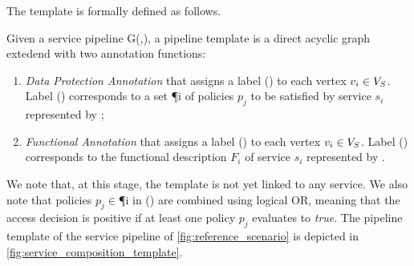 The template is formally defined as follows.

\begin{definition} \label{def:template}
  Given a service pipeline G(\V,\E), a pipeline template \tChartFunction is a direct acyclic graph extedend with two annotation functions:
  \begin{enumerate}%
    \item \emph{Data Protection Annotation} \myLambda that assigns a label \myLambda() to each vertex $v_{i}\in V_S$. Label \myLambda() corresponds to a set \P{i} of policies $p_j$ to be satisfied by service $s_i$ represented by ;
    \item \emph{Functional Annotation} \myGamma that assigns a label \myGamma() to each vertex $v_{i}\in V_S$. Label \myGamma() corresponds to the functional description $F_i$ of service $s_i$ represented by .
  \end{enumerate}
\end{definition}

We note that, at this stage, the template is not yet linked to any service. We also note that policies $p_j$$\in$\P{i} in \myLambda() are combined using logical OR, meaning that the access decision is positive if at least one policy $p_j$ evaluates to \emph{true}.
     The pipeline template of the service pipeline of \cref{fig:reference_scenario} is depicted in \cref{fig:service_composition_template}.

